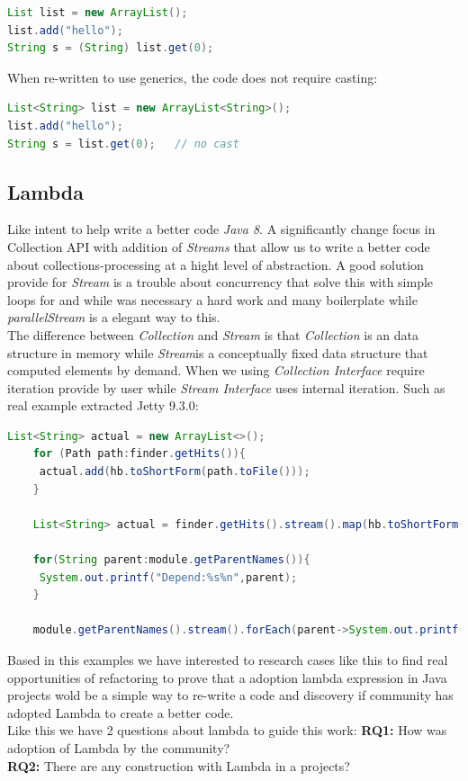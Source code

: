 \documentclass{sig-alternate-05-2015}
\begin{document}
\begin{lstlisting}[language=java]
List list = new ArrayList();
list.add("hello");
String s = (String) list.get(0);
\end{lstlisting}

When re-written to use generics, the code does not require casting:

\begin{lstlisting}[language=java]
List<String> list = new ArrayList<String>();
list.add("hello");
String s = list.get(0);   // no cast
\end{lstlisting}

\subsection{Lambda}
	Like intent to help write a better code \textit{Java 8}. A significantly change focus in Collection API with addition of \textit{Streams} that allow us to write a better code about collections-processing at a hight level of abstraction. A good solution provide for \textit{Stream} is a trouble about concurrency that solve this with simple loops for and while was necessary a hard work and many boilerplate while \textit{parallelStream} is a elegant way to this.\\
	
	The difference between \textit{Collection} and \textit{Stream} is that \textit{Collection} is an data structure in memory while \textit{Stream}is a conceptually fixed data structure that computed elements by demand. When we using \textit{Collection Interface} require iteration provide by user while \textit{Stream Interface} uses internal iteration. Such as real example extracted Jetty 9.3.0:\\

	\begin{lstlisting}[language=java]
	List<String> actual = new ArrayList<>(); 
	for (Path path:finder.getHits()){
	 actual.add(hb.toShortForm(path.toFile()));
	}
	
	List<String> actual = finder.getHits().stream().map(hb.toShortForm(Path::toFile)).collect(toList());
	
	for(String parent:module.getParentNames()){
	 System.out.printf("Depend:%s%n",parent);
	}
	
	module.getParentNames().stream().forEach(parent->System.out.printf("Depend:%s%n",parent));
\end{lstlisting}

Based in this examples we have interested to research cases like this to find real opportunities of refactoring to prove that a adoption lambda expression in Java projects wold be a simple way to re-write a code and discovery if community has adopted Lambda to create a better code.\\
Like this we have 2 questions about lambda to guide this work:
\textbf{RQ1:} How was adoption of Lambda by the community?\\
\textbf{RQ2:} There are any construction with Lambda in a projects?\\
\end{document}
